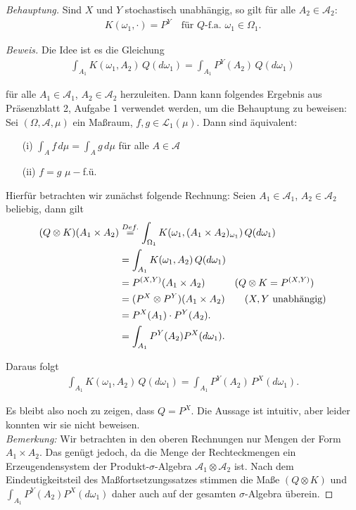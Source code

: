 \documentclass[10pt]{article}
\newcommand{\A}{\mathcal{A}}
\newcommand{\beh}{\textit{Behauptung. }}
\begin{document}
\beh Sind $X$ und $Y$ stochastisch unabhängig, so gilt für alle $A_2\in \A_2$:
	\begin{align*}
		K(\omega_1, \cdot) = P^Y \quad\text{für $Q$-f.a. $\omega_1\in\Omega_1$}.
	\end{align*}

\begin{proof}[Beweis]
	Die Idee ist es die Gleichung
	\begin{align*}
		\int_{A_1} K(\omega_1, A_2) \, Q(d\omega_1) = \int_{A_1} P^{Y}(A_2) \, Q(d\omega_1)
	\end{align*}

	für alle $A_1\in\A_1$, $A_2\in\A_2$ herzuleiten. Dann kann folgendes Ergebnis aus Präsenzblatt 2, Aufgabe 1 verwendet werden,
	um die Behauptung zu beweisen: \\
	Sei $(\Omega,\A,\mu)$ ein Maßraum, $f,g\in\mathcal{L}_1(\mu)$. Dann sind äquivalent: 
	\begin{itemize}
		\item[(i)] $\int_{A} f \, d\mu = \int_{A} g \, d\mu$  für alle $A\in\A$
		\item[(ii)] $f = g$ $\mu-$f.ü. 
	\end{itemize}

	Hierfür betrachten wir zunächst folgende Rechnung: Seien $A_1\in\A_1$, $A_2\in\A_2$ beliebig, dann gilt
	\begin{align*}
		(Q\otimes K)(A_1 \times A_2) &\stackrel{Def.}{=} \int_{\Omega_1} K(\omega_1, (A_1\times A_2)_{\omega_1}) \, Q(d\omega_1) \\
									 &= \int_{A_1} K(\omega_1, A_2) \, Q(d\omega_1)						    \\
									 &= P^{(X,Y)}(A_1\times A_2) \hspace{0.35cm}\qquad (Q\otimes K = P^{(X,Y)})  			\\
									 &= (P^X \otimes P^Y)(A_1 \times A_2)  \qquad (X,Y \text{ unabhängig})  \\
									 &= P^X(A_1) \cdot P^Y(A_2).											\\
									 &= \int_{A_1} P^Y(A_2) P^X(d\omega_1).
	\end{align*}

	Daraus folgt 
	\begin{align*}
		\int_{A_1} K(\omega_1, A_2) \, Q(d\omega_1) = \int_{A_1} P^Y(A_2) \, P^X(d\omega_1).
	\end{align*}

	Es bleibt also noch zu zeigen, dass $Q = P^X$. Die Aussage ist intuitiv, aber leider konnten wir sie nicht beweisen.  \\
	\textit{Bemerkung:} Wir betrachten in den oberen Rechnungen nur Mengen der Form $A_1 \times A_2$. Das genügt jedoch, da die 
	Menge der Rechteckmengen ein Erzeugendensystem der Produkt-$\sigma$-Algebra $\A_1 \otimes \A_2$ ist. Nach dem Eindeutigkeitsteil
	des Maßfortsetzungssatzes stimmen die Maße $(Q\otimes K)$ und $\int_{A_1} P^Y(A_2) P^X(d\omega_1)$ daher auch auf der gesamten 
	$\sigma$-Algebra überein.
\end{proof}
\end{document}
